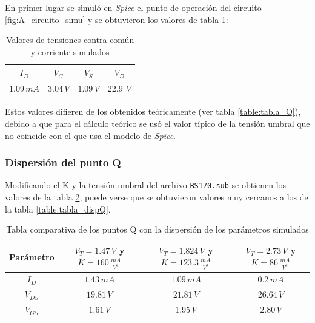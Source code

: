 \documentclass[10pt,spanish,a4paper,notitlepage]{article}
\begin{document}
En primer lugar se simuló en \emph{Spice} el punto de operación del circuito \ref{fig:A_circuito_simu} y se obtuvieron los valores de tabla \ref{table:tabla_Q_simu}:

\begin{table}[H]
    \centering
    \begin{tabular}{|c|c|c|c|} %
    \hline
    $I_D$ & $V_{G}$ & $V_{S}$ & $V_{D}$ \\ \hline
     $1.09\,\unit{mA}$ & $3.04\,\unit{V}$  & $1.09\,\unit{V}$  & $22.9\,\unit{\ V}$  \\ \hline
    \end{tabular}
    \caption{Valores de tensiones contra común y corriente simulados}
    \label{table:tabla_Q_simu}
    \end{table}

Estos valores difieren de los obtenidos teóricamente (ver tabla
\ref{table:tabla_Q}), debido a que para el cálculo teórico se usó el
valor típico de la tensión umbral que no coincide con el que usa el
modelo de \emph{Spice}. 

\subsubsection{Dispersión del punto Q}
Modificando el K y la tensión umbral del archivo
\texttt{BS170.sub} se obtienen los valores de la tabla \ref{table:tabla_dispQ_simu}, puede verse que se obtuvieron valores muy cercanos a los de la tabla \ref{table:tabla_dispQ}.

\begin{table}[H]
\centering
\begin{tabular}{|c|c|c|c|} %
\hline
Parámetro & $V_{T}=1.47\,\unit{V}$ y $K=160\,\unit{\frac{mA}{V^2}}$ &  $V_{T}=1.824\,\unit{V}$ y $K=123.3\,\unit{\frac{mA}{V^2}}$ & $V_{T}=2.73\,\unit{V}$ y $K=86\,\unit{\frac{mA}{V^2}}$  \\ \hline
$I_D$ & $1.43\,\unit{mA}$  &  $1.09\,\unit{mA}$ & $0.2\,\unit{mA}$   \\ \hline
$V_{DS}$ & $19.81\,\unit{V}$ & $21.81\,\unit{V}$  &  $26.64\,\unit{V}$  \\ \hline
$V_{GS}$ & $1.61\,\unit{V}$ & $1.95\,\unit{V}$ & $2.80\,\unit{V}$  \\ \hline
\end{tabular}
\caption{Tabla comparativa de los puntos Q con la dispersión de los parámetros simulados }
\label{table:tabla_dispQ_simu}
\end{table}
\end{document}
